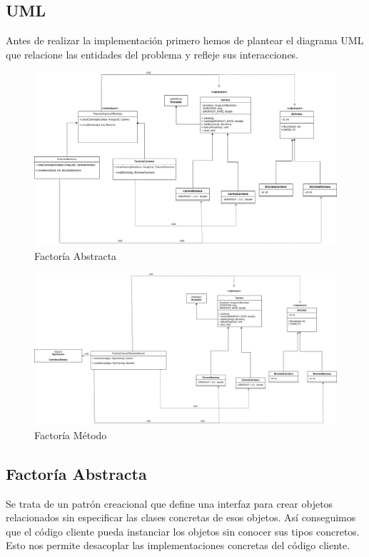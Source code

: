 \documentclass{article}
\begin{document}
\subsection{UML}
Antes de realizar la implementación primero hemos de plantear el diagrama UML que relacione las entidades del problema y refleje sus interacciones.
\begin{figure}[h]
	\centering
	\includegraphics[width=1\textwidth]{DS_ej1.drawio.png}
	\caption{Factoría Abstracta}
	\label{fig:factoria_abstracta}
\end{figure}

\newpage
\begin{figure}[h]
	\includegraphics[width=1\textwidth]{factoria_metodo.png}
	\caption{Factoría Método}
	\label{fig:factoria_metodo}
\end{figure}

\subsection{Factoría Abstracta}
Se trata de un patrón creacional que define una interfaz para crear objetos relacionados sin especificar las clases concretas de esos objetos. Así conseguimos que el código cliente pueda instanciar los objetos sin conocer sus tipos concretos. Esto nos permite desacoplar las implementaciones concretas del código cliente. \\
\end{document}
